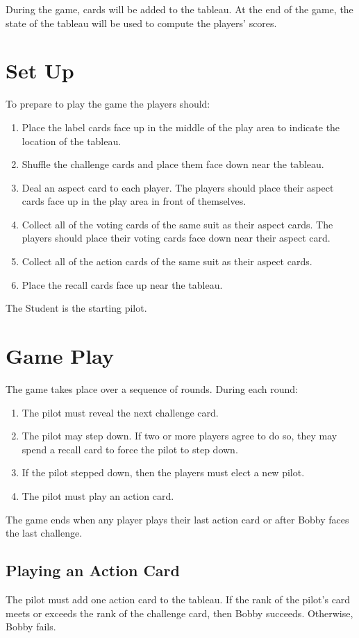 \documentclass[a4paper, 10pt,notumble]{leaflet}
\begin{document}
\bigskip
During the game, cards will be added to the tableau.
At the end of the game, the state of the tableau will be used to compute the players' scores.

\section{Set Up}
To prepare to play the game the players should:
\begin{enumerate}
\item Place the label cards face up in the middle of the play area to indicate the location of the tableau.
\item Shuffle the challenge cards and place them face down near the tableau.
\item Deal an aspect card to each player. The players should place their aspect cards face up in the play area in front of themselves.
\item Collect all of the voting cards of the same suit as their aspect cards. The players should place their voting cards face down near their aspect card.
\item Collect all of the action cards of the same suit as their aspect cards.
\item Place the recall cards face up near the tableau. 
\end{enumerate}
The Student is the starting pilot.

\newpage

\section{Game Play}
The game takes place over a sequence of rounds.
During each round:
\begin{enumerate}
	\item The pilot must reveal the next challenge card. 
	\item The pilot may step down. If two or more players agree to do so, they may spend a recall card to force the pilot to step down.
	\item If the pilot stepped down, then the players must elect a new pilot.
	\item The pilot must play an action card. 
\end{enumerate}
The game ends when any player plays their last action card or after Bobby faces the last challenge.

\subsection{Playing an Action Card}
The pilot must add one action card to the tableau.
If the rank of the pilot's card meets or exceeds the rank of the challenge card, then Bobby succeeds. Otherwise, Bobby fails.
\end{document}
